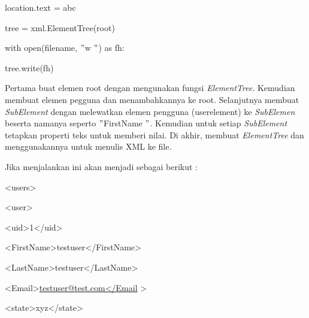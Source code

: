\documentclass{wileySix}
\begin{document}
\begin{myEnumerate}
\begin{myEnumerate}
{\noindent 
{\fontsize{10pt}{10pt}\selectfont location.text = abc} \par
\vspace{10pt}
\noindent 
{\fontsize{10pt}{10pt}\selectfont tree = xml.ElementTree(root)} \par
\noindent 
{\fontsize{10pt}{10pt}\selectfont with open(filename,  $ " $w $ " $) as fh:} \par
\noindent 
{\fontsize{10pt}{10pt}\selectfont tree.write(fh)} \par
\vspace{10pt}
\noindent 
\hspace*{0.5in} Pertama buat elemen root dengan mengunakan fungsi \textit{ElementTree}. Kemudian membuat elemen pegguna dan menambahkannya ke root. Selanjutnya membuat \textit{SubElement }dengan melewatkan elemen pengguna (userelement) ke \textit{SubElemen} beserta namanya seperto  $ " $FirstName $ " $. Kemudian untuk setiap \textit{SubElement} tetapkan properti teks untuk memberi nilai. Di akhir, membuat \textit{ElementTree} dan menggunakannya untuk menulis XML ke file. \par
\noindent 
\hspace*{0.5in} Jika menjalankan ini akan menjadi sebagai berikut : \par
\noindent 
{\fontsize{10pt}{10pt}\selectfont <users>} \par
\noindent 
{\fontsize{10pt}{10pt}\selectfont  \hspace*{0.5in} <user>} \par
\noindent 
{\fontsize{10pt}{10pt}\selectfont  \hspace*{0.5in}  \hspace*{0.5in} <uid>1</uid>} \par
\noindent 
{\fontsize{10pt}{10pt}\selectfont  \hspace*{0.5in}  \hspace*{0.5in} <FirstName>testuser</FirstName>} \par
\noindent 
{\fontsize{10pt}{10pt}\selectfont  \hspace*{0.5in}  \hspace*{0.5in} <LastName>testuser</LastName>} \par
\noindent 
{\fontsize{10pt}{10pt}\selectfont  \hspace*{0.5in}  \hspace*{0.5in} <Email>\href{mailto:testuser@test.com $  \%  $3c/Email}{testuser@test.com</Email}
	>} \par
\noindent 
{\fontsize{10pt}{10pt}\selectfont  \hspace*{0.5in}  \hspace*{0.5in} <state>xyz</state>} \par
}
\end{myEnumerate}
\end{myEnumerate}
\end{document}
